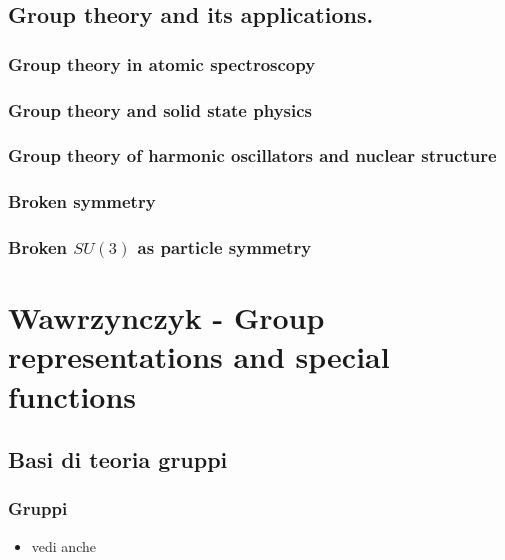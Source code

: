 \documentclass[oneside,12pt]{memoir}
\begin{document}
\chapter{Group theory and its applications.}
\PartialToc


\section{Group theory in atomic spectroscopy}

\section{Group theory and solid state physics}

\section{Group theory of harmonic oscillators and nuclear structure}

\section{Broken symmetry}

\section{Broken \texorpdfstring{$SU(3)$}{SU3} as particle symmetry}


\printbibliography[heading=subbibintoc]

\part{Wawrzynczyk - Group representations and special functions}

\chapter{Basi di teoria gruppi}
\PartialToc

\section{Gruppi}

\begin{itemize}
\item vedi anche 
\end{itemize}
\end{document}
